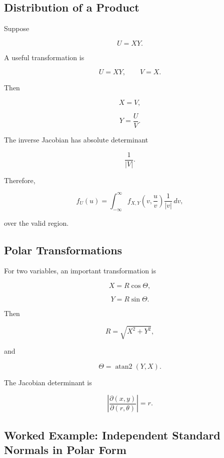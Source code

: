 \subsection{Distribution of a Product}
\label{subsec:distribution-product}

Suppose

\[
U=XY.
\]

A useful transformation is

\[
U=XY,
\qquad
V=X.
\]

Then

\[
X=V,
\]

\[
Y=\frac{U}{V}.
\]

The inverse Jacobian has absolute determinant

\[
\boxed{
\frac1{|V|}.
}
\]

Therefore,

\[
\boxed{
f_U(u)
=
\int_{-\infty}^{\infty}
f_{X,Y}
\left(
v,\frac{u}{v}
\right)
\frac1{|v|}
\,dv,
}
\]

over the valid region.

\subsection{Polar Transformations}
\label{subsec:polar-transformations-probability}

For two variables, an important transformation is

\[
X=R\cos\Theta,
\]

\[
Y=R\sin\Theta.
\]

Then

\[
R
=
\sqrt{X^2+Y^2},
\]

and

\[
\Theta
=
\operatorname{atan2}(Y,X).
\]

The Jacobian determinant is

\[
\boxed{
\left|
\frac{\partial(x,y)}{\partial(r,\theta)}
\right|
=
r.
}
\]

\subsection{Worked Example: Independent Standard Normals in Polar Form}
\label{subsec:worked-polar-standard-normals}

